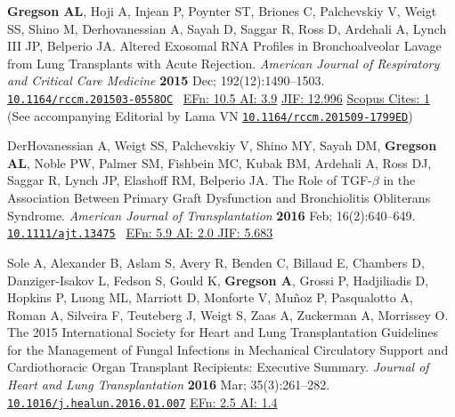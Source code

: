 \documentclass[letterpaper,11pt,sans,final]{moderncv}%
\begin{document}
\begin{thebibliography}{1}
  \bibitem[28]{} \textbf{Gregson AL}, Hoji A, Injean P, Poynter ST, Briones C, Palchevskiy V, Weigt SS, Shino M, Derhovanessian A, Sayah D, Saggar R, Ross D, Ardehali A, Lynch III JP, Belperio JA. Altered Exosomal RNA Profiles in Bronchoalveolar Lavage from Lung Transplants with Acute Rejection. {\color{BrickRed}\textit{American Journal of Respiratory and Critical Care Medicine}} \textbf{2015} Dec; 192(12):1490--1503. \href{http://www.atsjournals.org/doi/abs/10.1164/rccm.201503-0558OC#.VeDm8JWW25M}{\nolinkurl{10.1164/rccm.201503-0558OC}}~ 
    {\color{NavyBlue}\href{http://www.eigenfactor.org/rankings.php?bsearch=AMERICAN+JOURNAL+OF+RESPIRATORY+AND+CRITICAL+CARE+MEDICINE&searchby=journal&orderby=eigenfactor}{{\smaller EFn: 10.5 AI: 3.9}}
      \href{http://admin-apps.webofknowledge.com/JCR/JCR?RQ=RECORD&rank=1&journal=AM+J+RESP+CRIT+CARE}{{\smaller JIF: 12.996}}
      \href{http://www.scopus.com/record/display.uri?eid=2-s2.0-84951933250&origin=resultslist&sort=plf-f&src=s&st1=gregson+&st2=&sid=A253098209782A207E8DEF555629A3D6.iqs8TDG0Wy6BURhzD3nFA%3a90&sot=b&sdt=b&sl=19&s=FIRSTAUTH%28gregson+%29&relpos=0&citeCnt=1&searchTerm=FIRSTAUTH%28gregson+%29}{{\smaller Scopus Cites: 1}}
    }~ 
    \\(See accompanying Editorial by Lama VN \href{http://www.atsjournals.org/doi/abs/10.1164/rccm.201509-1799ED}{\nolinkurl{10.1164/rccm.201509-1799ED}})

  \bibitem[29]{} DerHovanessian A, Weigt SS, Palchevskiy V, Shino MY, Sayah DM, \textbf{Gregson AL}, Noble PW, Palmer SM, Fishbein MC, Kubak BM, Ardehali A, Ross DJ, Saggar R, Lynch JP, Elashoff RM, Belperio JA. The Role of {\smaller TGF}-$\beta$ in the Association Between Primary Graft Dysfunction and Bronchiolitis Obliterans Syndrome. {\color{BrickRed}\textit{American Journal of Transplantation}} \textbf{2016} Feb; 16(2):640--649. \href{http://onlinelibrary.wiley.com/doi/10.1111/ajt.13475/abstract}{\nolinkurl{10.1111/ajt.13475}}~
       {\color{NavyBlue}\href{http://52.6.43.8/projects/journalRank/rankings.php?bsearch=AMERICAN+JOURNAL+OF+TRANSPLANTATION&searchby=journal&orderby=eigenfactor}{{\smaller EFn: 5.9 AI: 2.0 JIF: 5.683}} 
       }

  \bibitem[30]{} Sole A, Alexander B, Aslam S, Avery R, Benden C, Billaud E, Chambers D, Danziger-Isakov L, Fedson S, Gould K, \textbf{Gregson A}, Grossi P, Hadjiliadis D, Hopkins P, Luong ML, Marriott D, Monforte V, Mu\~{n}oz P, Pasqualotto A, Roman A, Silveira F, Teuteberg J, Weigt S, Zaas A, Zuckerman A, Morrissey O. The 2015 International Society for Heart and Lung Transplantation Guidelines for the Management of Fungal Infections in Mechanical Circulatory Support and Cardiothoracic Organ Transplant Recipients: Executive Summary.  {\color{BrickRed}\textit{Journal of Heart and Lung Transplantation}} \textbf{2016} Mar; 35(3):261--282. \href{http://www.sciencedirect.com/science/article/pii/S1053249816000541}{\nolinkurl{10.1016/j.healun.2016.01.007}}
    {\color{NavyBlue} \href{http://www.eigenfactor.org/rankings.php?search=JOURNAL+OF+HEART+AND+LUNG+TRANSPLANTATION&search2=&search3=&searchby=journal}{{\smaller EFn: 2.5 AI: 1.4}}
    }



\end{thebibliography}
\end{document}
